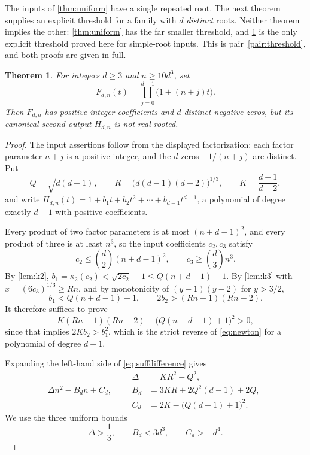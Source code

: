 \documentclass[11pt,letterpaper]{article}
\numberwithin{equation}{section}
\newtheorem{theorem}{Theorem}[section]
\theoremstyle{definition}
\theoremstyle{remark}
\newcommand{\kap}{\kappa}
\begin{document}
The inputs of \cref{thm:uniform} have a single repeated root. The next
theorem supplies an explicit threshold for a family with $d$ \emph{distinct}
roots. Neither theorem implies the other: \cref{thm:uniform} has the far
smaller threshold, and \cref{thm:explicitsimple} is the only explicit
threshold proved here for simple-root inputs. This is
pair~\ref{pair:threshold}, and both proofs are given in full.

\begin{theorem}\label{thm:explicitsimple}
For integers $d\ge3$ and $n\ge10d^3$, set
\[
 F_{d,n}(t)=\prod_{j=0}^{d-1}\bigl(1+(n+j)t\bigr).
\]
Then $F_{d,n}$ has positive integer coefficients and $d$ distinct negative
zeros, but its canonical second output $H_{d,n}$ is not real-rooted.
\end{theorem}
\begin{proof}
The input assertions follow from the displayed factorization: each factor
parameter $n+j$ is a positive integer, and the $d$ zeros $-1/(n+j)$ are
distinct. Put
\[
 Q=\sqrt{d(d-1)},\qquad
 R=\bigl(d(d-1)(d-2)\bigr)^{1/3},\qquad
 K=\frac{d-1}{d-2},
\]
and write $H_{d,n}(t)=1+b_1t+b_2t^2+\cdots+b_{d-1}t^{d-1}$, a polynomial of
degree exactly $d-1$ with positive coefficients.

Every product of two factor parameters is at most $(n+d-1)^2$, and every
product of three is at least $n^3$, so the input coefficients $c_2,c_3$ satisfy
\[
 c_2\le\binom d2(n+d-1)^2,\qquad
 c_3\ge\binom d3n^3 .
\]
By \cref{lem:k2}, $b_1=\kap_2(c_2)<\sqrt{2c_2}+1\le Q(n+d-1)+1$. By
\cref{lem:k3} with $x=(6c_3)^{1/3}\ge Rn$, and by monotonicity of
$(y-1)(y-2)$ for $y>3/2$,
\begin{equation}\label{eq:bbounds}
 b_1<Q(n+d-1)+1,\qquad 2b_2>(Rn-1)(Rn-2).
\end{equation}
It therefore suffices to prove
\begin{equation}\label{eq:suffdifference}
 K(Rn-1)(Rn-2)-\bigl(Q(n+d-1)+1\bigr)^2>0,
\end{equation}
since that implies $2Kb_2>b_1^2$, which is the strict reverse of
\eqref{eq:newton} for a polynomial of degree $d-1$.

Expanding the left-hand side of \eqref{eq:suffdifference} gives
\begin{equation}\label{eq:quadraticbound}
 \Delta n^2-B_dn+C_d,\qquad
\begin{aligned}
 \Delta&=KR^2-Q^2,\\
 B_d&=3KR+2Q^2(d-1)+2Q,\\
 C_d&=2K-\bigl(Q(d-1)+1\bigr)^2 .
\end{aligned}
\end{equation}
We use the three uniform bounds
\begin{equation}\label{eq:threebounds}
 \Delta>\frac13,\qquad B_d<3d^3,\qquad C_d>-d^4 .
\end{equation}


\end{proof}
\end{document}
